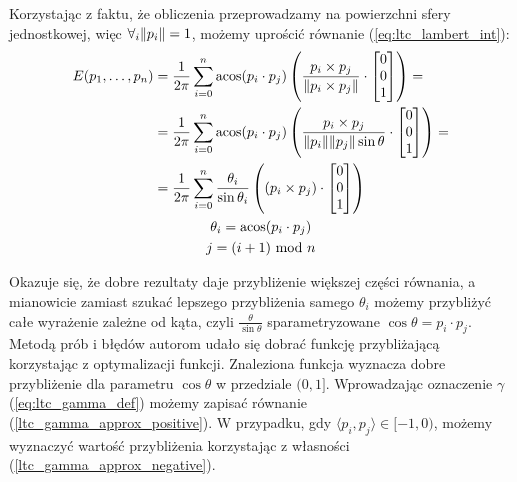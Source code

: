 \documentclass[../main.tex]{subfiles}
\begin{document}
Korzystając z faktu, że obliczenia przeprowadzamy na powierzchni sfery jednostkowej, więc $\forall_{i}  \norm{p_i} = 1$, możemy uprościć równanie (\ref{eq:ltc_lambert_int}):
\begin{equation}
\begin{gathered}
\begin{aligned}
E(p_1, \ldots, p_n) &=
\frac{1}{2\pi}
\sum_{i=0}^{n} {
    \acos( p_i \cdot p_j )
    \left( {
        \frac{p_i \times p_j}{\norm{p_i \times p_j}}
        \cdot
        \left[ \begin{matrix} 0 \\ 0 \\ 1 \end{matrix} \right]
    } \right)
} = \\
&= \frac{1}{2\pi}
\sum_{i=0}^{n} {
    \acos( p_i \cdot p_j )
    \left( {
        \frac{p_i \times p_j}{\norm{p_i}\norm{p_j}\sin\theta}
        \cdot
        \left[ \begin{matrix} 0 \\ 0 \\ 1 \end{matrix} \right]
    } \right)
} = \\
&= \frac{1}{2\pi}
\sum_{i=0}^{n} {
    \frac{\theta_i}{\sin\theta_i}
    \left( {
        \left( p_i \times p_j \right)
        \cdot
        \left[ \begin{matrix} 0 \\ 0 \\ 1 \end{matrix} \right]
    } \right)
}
\end{aligned} \\
\theta_i = \acos(p_i \cdot p_j) \\
j = (i+1) \text{ mod } n
\end{gathered}
\label{eq:ltc_lambert_int_practical}
\end{equation}

Okazuje się, że dobre rezultaty daje przybliżenie większej części równania, a mianowicie zamiast szukać lepszego przybliżenia samego $\theta_i$ możemy przybliżyć całe wyrażenie zależne od kąta, czyli $\frac{\theta}{\sin\theta}$ sparametryzowane $\cos\theta = p_i \cdot p_j$. Metodą prób i błędów autorom udało się dobrać funkcję przybliżającą korzystając z optymalizacji funkcji. Znaleziona funkcja wyznacza dobre przybliżenie dla parametru $\cos\theta$ w przedziale $(0,1]$. Wprowadzając oznaczenie $\gamma$ (\ref{eq:ltc_gamma_def}) możemy zapisać równanie (\ref{ltc_gamma_approx_positive}). W przypadku, gdy $\langle p_i, p_j \rangle \in [-1, 0)$, możemy wyznaczyć wartość przybliżenia korzystając z własności (\ref{ltc_gamma_approx_negative}).
\end{document}
